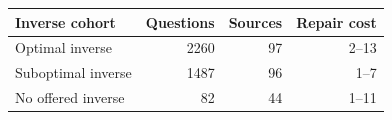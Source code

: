 \begin{tabular}{lrrr}\toprule
Inverse cohort & Questions & Sources & Repair cost\\\midrule
Optimal inverse & 2260 & 97 & 2--13\\
Suboptimal inverse & 1487 & 96 & 1--7\\
No offered inverse & 82 & 44 & 1--11\\
\bottomrule\end{tabular}
